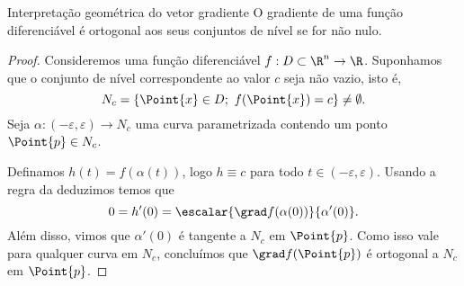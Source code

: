 \begin{theorem}{Interpretação geométrica do vetor gradiente}{}
    O gradiente de uma função diferenciável é ortogonal aos seus conjuntos de nível se for não nulo. 
\end{theorem}
\begin{proof}
Consideremos uma função diferenciável $f:D\subset \R^n\to \R$. Suponhamos que o conjunto de nível correspondente ao valor $c$ seja não vazio, isto é,
$$N_c=\left\{\Point{x}\in D;~f(\Point{x})=c \right\}\neq \emptyset.$$ 
Seja $\alpha: (-\varepsilon,\varepsilon)\to N_c$ uma curva parametrizada contendo um ponto $\Point{p}\in N_c$. 

Definamos $h(t)=f(\alpha(t))$, logo $h\equiv c$ para todo $t\in(-\varepsilon,\varepsilon)$. Usando a regra da deduzimos temos que 
$$0=h'(0)=\escalar{\grad f(\alpha(0))}{\alpha'(0)}.$$
Além disso, vimos que $\alpha'(0)$ é tangente a $N_c$ em $\Point{p}$. Como isso vale para qualquer curva em $N_c$, concluímos que $\grad f(\Point{p})$ é ortogonal a $N_c$ em $\Point{p}$. 
\end{proof}







